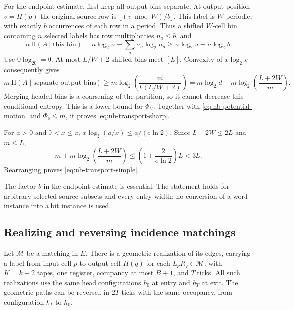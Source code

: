 \begin{informalproof}
For the endpoint estimate, first keep all output bins separate.  At
output position $v=\Pi(p)$ the original source row is
$\lfloor(v\bmod W)/b\rfloor$.  This label is $W$-periodic, with exactly
$b$ occurrences of each row in a period.  Thus a shifted $W$-cell bin
containing $n$ selected labels has row multiplicities $n_a\le b$, and
\[
 n\,\mathrm H(A\mid\text{this bin})
     =n\log_2 n-\sum_a n_a\log_2n_a
     \ge n\log_2 n-n\log_2b.
\]
Use $0\log_20=0$.  At most $L/W+2$ shifted bins meet $[L]$.
Convexity of $x\log_2x$ consequently gives
\[
 m\,\mathrm H(A\mid\text{separate output bins})
   \ge m\log_2\!\left(\frac{m}{b(L/W+2)}\right)
   =m\log_2d-m\log_2\!\left(\frac{L+2W}{m}\right).
\]
Merging headed bins is a coarsening of the partition, so it cannot
decrease this conditional entropy.  This is a lower bound for $\Phi_U$.
Together with \eqref{eq:nb-potential-motion} and $\Phi_0\le m$, it proves
\eqref{eq:nb-transport-sharp}.

For $a>0$ and $0<x\le a$,
$x\log_2(a/x)\le a/(e\ln2)$.  Since $L+2W\le2L$ and $m\le L$,
\[
 m+m\log_2\!\left(\frac{L+2W}{m}\right)
 \le \left(1+\frac{2}{e\ln2}\right)L<3L.
\]
Rearranging proves \eqref{eq:nb-transport-simple}.
\end{informalproof}

The factor $b$ in the endpoint estimate is essential.  The statement
holds for arbitrary selected source subsets and every entry width; no
conversion of a word instance into a bit instance is used.

\subsection{Realizing and reversing incidence matchings}

\begin{lemma}\label{lem:nb-matching}
\notformalized
Let $\mathcal M$ be a matching in $E$.  There is a geometric realization
of its edges, carrying a label from input cell $p$ to output cell
$\Pi(q)$ for each $L_pR_q\in\mathcal M$, with $K=k+2$ tapes, one
register, occupancy at most $B+1$, and $T$ ticks.  All such realizations
use the same head configurations $h_0$ at entry and $h_T$ at exit.
The geometric paths can be reversed in $2T$ ticks with the same
occupancy, from configuration $h_T$ to $h_0$.
\end{lemma}

